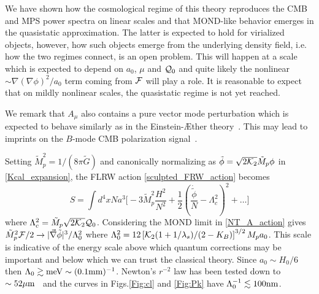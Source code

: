 \documentclass[twocolumn,prl,preprintnumbers,amsmath,amssymb,nofootinbib]{revtex4-2}
\newcommand{\meV}{\ensuremath{{\rm meV}}}
\newcommand{\mum}{\ensuremath{\mu {\rm m}}}
\newcommand{\nm}{\ensuremath{{\rm nm}}}
\newcommand{\mm}{\ensuremath{{\rm mm}}}
\newcommand{\grad}{\ensuremath{\vec{\nabla}}}
\newcommand{\lambdas}{\lambda_s}
\newcommand{\Kcal}{{\cal K}}
\newcommand{\phit}{\tilde{\phi}}
\newcommand{\Mpt}{\tilde{M}_p}
\newcommand{\Fcal}{{\cal F}}
\newcommand{\Qcal}{{\cal Q}}
\newcommand{\Gt}{\ensuremath{\tilde{G}}}
\newcommand{\KB}{\ensuremath{K_{B}}}
\begin{document}
We have shown how the cosmological regime of this theory reproduces the CMB and MPS power spectra on linear scales and that MOND-like behavior emerges in the quasistatic approximation. 
The latter is expected to hold for virialized objects, however, how such objects emerge from the underlying density field, i.e. how the two regimes connect, is
an open problem. This will happen at a scale which is expected to depend on $a_0$, $\mu$ and $\Qcal_0$ and quite likely the nonlinear $\sim \nabla (\nabla \phi)^2/a_0$ term coming from $\Fcal$ will play a role.
It is reasonable to expect that on mildly nonlinear scales, the quasistatic regime is not yet reached.

We remark that $A_\mu$ also contains a pure vector mode perturbation which is expected to behave similarly as 
in the Einstein-{\AE}ther theory~\cite{Dirac1962,JacobsonMattingly2000}. This may lead to imprints on the $B$-mode CMB polarization signal~\cite{Nakashima:2011fu}.


Setting $\Mpt^2 = 1/(8\pi \Gt)$ and canonically normalizing as $\phit =  \sqrt{2\Kcal_2} \Mpt \phi$ in \eqref{Kcal_expansion},
 the FLRW action \eqref{sculpted_FRW_action} becomes
\begin{equation}
 S = \int d^4x N a^3 \bigg[ -3\Mpt^2 \frac{H^2}{N^2} + \frac{1}{2} \left(   \frac{\dot{\tilde{\phi}}}{N}  - \Lambda_c^2\right)^2 + \ldots \bigg]
\end{equation}
where $\Lambda_c^2 =  \Mpt \sqrt{2\Kcal_2}\Qcal_0$. 
Considering the MOND limit  in \eqref{NT_A_action} gives
 $\Mpt^2 \Fcal /2 \rightarrow |\grad\tilde{\phi}|^3 / \Lambda_0^2$ where $\Lambda_0^2 = 12 \left[\Kcal_2(1+ 1/\lambdas)/(2-\KB)\right]^{3/2}   M_p a_0$.
This scale is indicative of the energy scale above which quantum corrections  may be important and below which we can trust the classical theory.
 Since $a_0 \sim H_0/6$ then $\Lambda_0  \gtrsim   \meV \sim  (0.1 \mm)^{-1}$.
Newton's $r^{-2}$ law has been tested down to $\sim 52\mum$~\cite{Lee:2020zjt}  and the curves in  Figs.\ref{Fig:cl} and \ref{Fig:Pk} have $\Lambda_0^{-1} \lesssim 100 \nm$.
\end{document}
